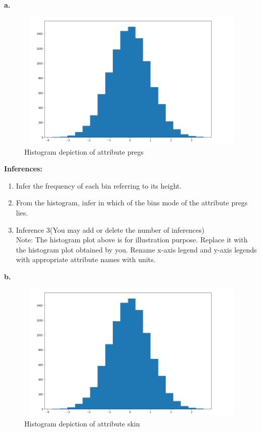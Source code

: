 \documentclass[12 pt, a4paper]{article}
\theoremstyle{definition}
\begin{document}
\section{}
\textbf{a.}
\begin{figure}[H]
	\centering
	\includegraphics[width=11.5cm,height=6.65cm]{histogram.png}
	\caption{Histogram depiction of attribute pregs}
	\label{Blockdia}
\end{figure}

\textbf{\Large Inferences:}
\begin{enumerate}

   \item Infer the frequency of each bin referring to its height.
   \item From the histogram, infer in which of the bins mode of the attribute pregs lies.
   \item Inference 3(You may add or delete the number of inferences)
\\Note: The histogram plot above is for illustration purpose. Replace it with the histogram plot obtained by you. Rename x-axis legend and y-axis legends with appropriate attribute names with units.

\end{enumerate}
\textbf{b.}
\begin{figure}[H]
	\centering
	\includegraphics[width=11.5cm,height=6.65cm]{histogram.png}
	\caption{Histogram depiction of attribute skin}
	\label{Blockdia}
\end{figure}
\end{document}
